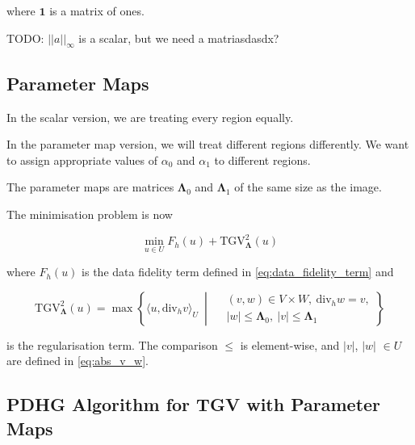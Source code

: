 where $\mathbf{1}$ is a matrix of ones.

TODO: $||a||_\infty$ is a scalar, but we need a matriasdasdx?



\subsection{Parameter Maps}

In the scalar version, we are treating every region equally.

In the parameter map version, we will treat different regions differently.
We want to assign appropriate values of $\alpha_0$ and $\alpha_1$ to different regions.

The parameter maps are matrices $\mathbf{\Lambda}_0$ and $\mathbf{\Lambda}_1$ of the same size as the image.

The minimisation problem is now

\begin{equation}
    \min_{u \in U} F_h(u) + \mathrm{TGV}^2_{\mathbf{\Lambda}}(u)
\end{equation}

where $F_h(u)$ is the data fidelity term defined in \cref{eq:data_fidelity_term} and

\begin{equation}
    \mathrm{TGV}^2_{\mathbf{\Lambda}}(u) = \max \left\{ \langle u, \mathrm{div}_h v \rangle_U \ \middle| \
    \begin{aligned}
    &(v, w) \in V \times W, \ \mathrm{div}_h w = v, \\
    &|w| \leq \mathbf{\Lambda}_0, \ |v| \leq \mathbf{\Lambda}_1
    \end{aligned}
    \right\}
\end{equation}

is the regularisation term.
The comparison $\leq$ is element-wise, and $|v|$, $|w|$ $\in U$ are defined in \cref{eq:abs_v_w}.

\subsection{PDHG Algorithm for TGV with Parameter Maps}

